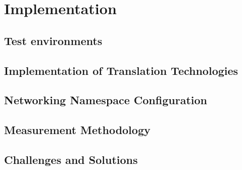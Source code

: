 \chapter{Implementation}

\section{Test environments}

\section{Implementation of Translation Technologies}

\section{Networking Namespace Configuration}

\section{Measurement Methodology}

\section{Challenges and Solutions}